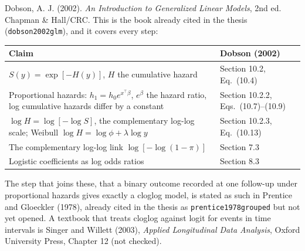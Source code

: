 \documentclass[11pt]{article}
\begin{document}
Dobson, A. J. (2002). \emph{An Introduction to Generalized Linear Models},
2nd ed. Chapman \& Hall/CRC. This is the book already cited in the thesis
(\texttt{dobson2002glm}), and it covers every step:

\begin{center}
\begin{tabular}{p{}p{}}
\toprule
Claim & Dobson (2002) \\
\midrule
$S(y) = \exp[-H(y)]$, $H$ the cumulative hazard & Section 10.2, Eq.~(10.4) \\
Proportional hazards: $h_1 = h_0 e^{x^\top\beta}$, $e^{\beta}$ the hazard ratio, log cumulative hazards differ by a constant & Section 10.2.2, Eqs.~(10.7)--(10.9) \\
$\log H = \log[-\log S]$, the complementary log-log scale; Weibull $\log H = \log\phi + \lambda\log y$ & Section 10.2.3, Eq.~(10.13) \\
The complementary log-log link $\log[-\log(1-\pi)]$ & Section 7.3 \\
Logistic coefficients as log odds ratios & Section 8.3 \\
\bottomrule
\end{tabular}
\end{center}

The step that joins these, that a binary outcome recorded at one follow-up
under proportional hazards gives exactly a cloglog model, is stated as such
in Prentice and Gloeckler (1978), already cited in the thesis as
\texttt{prentice1978grouped} but not yet opened. A textbook that treats
cloglog against logit for events in time intervals is Singer and Willett
(2003), \emph{Applied Longitudinal Data Analysis}, Oxford University Press,
Chapter 12 (not checked).
\end{document}
